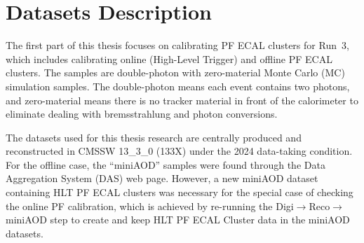 


\section{Datasets Description}

The first part of this thesis focuses on calibrating PF ECAL clusters for Run~3, which includes calibrating online (High-Level Trigger) and offline PF ECAL clusters.
The samples are double-photon with zero-material Monte Carlo (MC) simulation samples.
The double-photon means each event contains two photons, and zero-material means there is no tracker material in front of the calorimeter to eliminate dealing with
bremsstrahlung and photon conversions.

The datasets used for this thesis research are centrally produced and reconstructed in CMSSW 13\_3\_0 (133X) under the 2024 data-taking condition.
For the offline case, the ``miniAOD'' samples were found through the Data Aggregation System (DAS) web page.
However, a new miniAOD dataset containing HLT PF ECAL clusters was necessary for the special case of checking the online PF calibration,
which is achieved by re-running the Digi$\rightarrow$Reco$\rightarrow$miniAOD step to create and keep HLT PF ECAL Cluster data in the miniAOD datasets.

